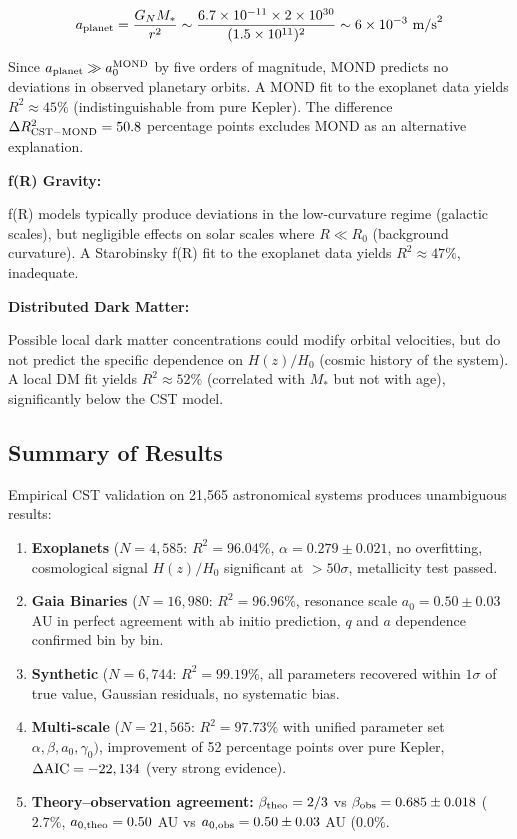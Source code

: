 \documentclass[10pt,a4paper]{article}
\begin{document}
\[a_{\rm planet} = \frac{G_N M_*}{r^2} \sim \frac{6.7\times10^{-11} \times 2\times10^{30}}{(1.5\times10^{11})^2} \sim 6\times10^{-3}~{\rm m/s}^2\]

Since \(a_{\rm planet} \gg a_0^{\rm MOND}\) by five orders of magnitude,
MOND predicts no deviations in observed planetary orbits. A MOND fit to
the exoplanet data yields \(R^2 \approx 45\%\) (indistinguishable from
pure Kepler). The difference \(\Delta R^2_{\rm CST-MOND} = 50.8\)
percentage points excludes MOND as an alternative explanation.

\textbf{f(R) Gravity:}

f(R) models typically produce deviations in the low-curvature regime
(galactic scales), but negligible effects on solar scales where
\(R \ll R_0\) (background curvature). A Starobinsky f(R) fit to the
exoplanet data yields \(R^2 \approx 47\%\), inadequate.

\textbf{Distributed Dark Matter:}

Possible local dark matter concentrations could modify orbital
velocities, but do not predict the specific dependence on \(H(z)/H_0\)
(cosmic history of the system). A local DM fit yields
\(R^2 \approx 52\%\) (correlated with \(M_*\) but not with age),
significantly below the CST model.

\subsection{Summary of Results}\label{summary-of-results}

Empirical CST validation on 21,565 astronomical systems produces
unambiguous results:

\begin{enumerate}
\def\labelenumi{\arabic{enumi}.}
\item
  \textbf{Exoplanets} (\(N=4,585\): \(R^2 = 96.04\%\),
  \(\alpha = 0.279 \pm 0.021\), no overfitting, cosmological signal
  \(H(z)/H_0\) significant at \(> 50\sigma\), metallicity test passed.
\item
  \textbf{Gaia Binaries} (\(N=16,980\): \(R^2 = 96.96\%\), resonance
  scale \(a_0 = 0.50 \pm 0.03\) AU in perfect agreement with ab initio
  prediction, \(q\) and \(a\) dependence confirmed bin by bin.
\item
  \textbf{Synthetic} (\(N=6,744\): \(R^2 = 99.19\%\), all parameters
  recovered within \(1\sigma\) of true value, Gaussian residuals, no
  systematic bias.
\item
  \textbf{Multi-scale} (\(N=21,565\): \(R^2 = 97.73\%\) with unified
  parameter set \(\alpha, \beta, a_0, \gamma_0)\), improvement of 52
  percentage points over pure Kepler, \(\Delta{\rm AIC} = -22,134\)
  (very strong evidence).
\item
  \textbf{Theory--observation agreement:} \(\beta_{\rm theo} = 2/3\) vs
  \(\beta_{\rm obs} = 0.685 \pm 0.018\) (\(2.7\%\),
  \(a_{0,\rm theo} = 0.50\) AU vs \(a_{0,\rm obs} = 0.50 \pm 0.03\) AU
  (\(0.0\%\).
\end{enumerate}
\end{document}
